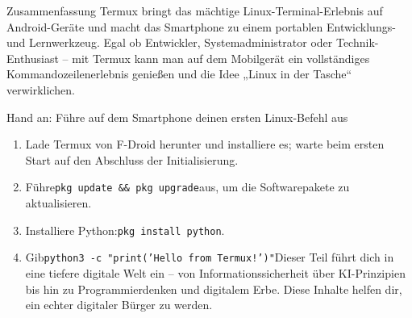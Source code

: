 \begin{tcbinfo}{Zusammenfassung}
Termux bringt das mächtige Linux-Terminal-Erlebnis auf Android-Geräte und macht das Smartphone zu einem portablen Entwicklungs- und Lernwerkzeug. Egal ob Entwickler, Systemadministrator oder Technik-Enthusiast – mit Termux kann man auf dem Mobilgerät ein vollständiges Kommandozeilenerlebnis genießen und die Idee „Linux in der Tasche“ verwirklichen.

\end{tcbinfo}

\begin{tcbpractice}{Hand an: Führe auf dem Smartphone deinen ersten Linux-Befehl aus}
\begin{enumerate}
  \item Lade Termux von F-Droid herunter und installiere es; warte beim ersten Start auf den Abschluss der Initialisierung.
  \item Führe\texttt{pkg update \&\& pkg upgrade}aus, um die Softwarepakete zu aktualisieren.
  \item Installiere Python:\texttt{pkg install python}.
  \item Gib\texttt{python3 -\allowbreak c "print('Hello from Termux!')"}Dieser Teil führt dich in eine tiefere digitale Welt ein – von Informationssicherheit über KI-Prinzipien bis hin zu Programmierdenken und digitalem Erbe. Diese Inhalte helfen dir, ein echter digitaler Bürger zu werden.
\end{enumerate}

\end{tcbpractice}
